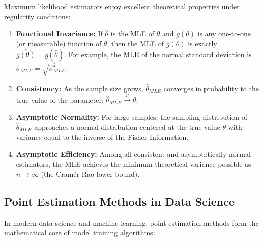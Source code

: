 \begin{propiedad}
	Maximum likelihood estimators enjoy excellent theoretical properties under regularity conditions:
	\begin{enumerate}
		\item \textbf{Functional Invariance:} If $\hat{\theta}$ is the MLE of $\theta$ and $g(\theta)$ is any one-to-one (or measurable) function of $\theta$, then the MLE of $g(\theta)$ is exactly $\widehat{g(\theta)} = g(\hat{\theta})$. For example, the MLE of the normal standard deviation is $\hat{\sigma}_{MLE} = \sqrt{\hat{\sigma}^2_{MLE}}$.
		\item \textbf{Consistency:} As the sample size grows, $\hat{\theta}_{MLE}$ converges in probability to the true value of the parameter: $\hat{\theta}_{MLE} \xrightarrow{p} \theta$.
		\item \textbf{Asymptotic Normality:} For large samples, the sampling distribution of $\hat{\theta}_{MLE}$ approaches a normal distribution centered at the true value $\theta$ with variance equal to the inverse of the Fisher Information.
		\item \textbf{Asymptotic Efficiency:} Among all consistent and asymptotically normal estimators, the MLE achieves the minimum theoretical variance possible as $n \to \infty$ (the Cramér-Rao lower bound).
	\end{enumerate}
\end{propiedad}

\subsection{Point Estimation Methods in Data Science}

In modern data science and machine learning, point estimation methods form the mathematical core of model training algorithms:

